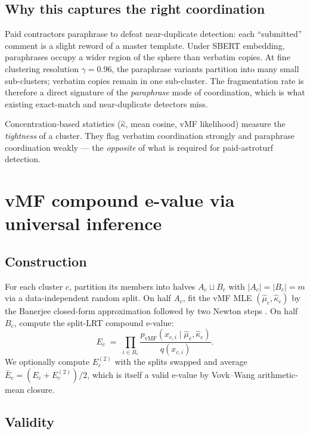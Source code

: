 \documentclass{article}
\theoremstyle{definition}
\theoremstyle{remark}
\begin{document}
\subsection{Why this captures the right coordination}

Paid contractors paraphrase to defeat near-duplicate detection: each ``submitted'' comment is a slight reword of a master template. Under SBERT embedding, paraphrases occupy a wider region of the sphere than verbatim copies. At fine clustering resolution $\gamma = 0.96$, the paraphrase variants partition into many small sub-clusters; verbatim copies remain in one sub-cluster. The fragmentation rate is therefore a direct signature of the \emph{paraphrase} mode of coordination, which is what existing exact-match and near-duplicate detectors miss.

Concentration-based statistics ($\hat\kappa$, mean cosine, vMF likelihood) measure the \emph{tightness} of a cluster. They flag verbatim coordination strongly and paraphrase coordination weakly --- the \emph{opposite} of what is required for paid-astroturf detection.

\section{vMF compound e-value via universal inference}
\label{sec:vmf}

\subsection{Construction}

For each cluster $c$, partition its members into halves $A_c \sqcup B_c$ with $|A_c| = |B_c| = m$ via a data-independent random split. On half $A_c$, fit the vMF MLE $(\hat\mu_c, \hat\kappa_c)$ by the Banerjee \citeyearpar{banerjee2005} closed-form approximation followed by two Newton steps \citep{hornik2014}. On half $B_c$, compute the split-LRT compound e-value:
\begin{equation}
E_c \;=\; \prod_{i \in B_c} \frac{p_{\mathrm{vMF}}(x_{c,i} \mid \hat\mu_c, \hat\kappa_c)}{q(x_{c,i})}.
\end{equation}
We optionally compute $E_c^{(2)}$ with the splits swapped and average $\bar E_c = (E_c + E_c^{(2)})/2$, which is itself a valid e-value by Vovk--Wang \citeyearpar{vovk2021} arithmetic-mean closure.

\subsection{Validity}
\end{document}
